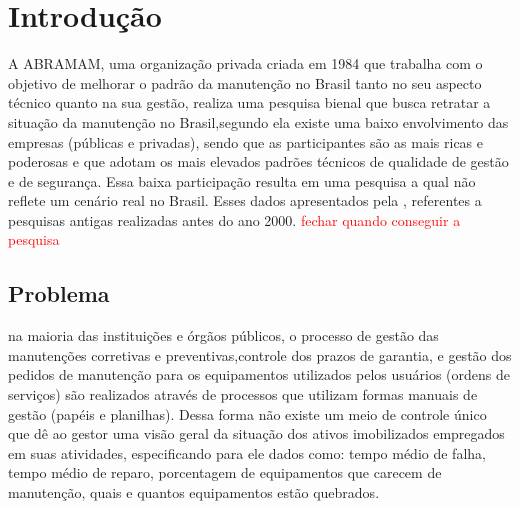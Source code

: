 \chapter{Introdução}
\label{cap-introducao}

A ABRAMAM, uma organização privada criada em 1984 que trabalha com o objetivo de melhorar o padrão da manutenção no Brasil tanto no seu aspecto técnico quanto na sua gestão, realiza uma pesquisa bienal que busca retratar a situação da manutenção no Brasil,segundo ela existe uma baixo envolvimento das empresas (públicas e privadas), sendo que as participantes são as mais ricas e poderosas e que adotam os mais elevados padrões técnicos  de qualidade de gestão e de segurança. Essa baixa participação resulta em uma pesquisa a qual não reflete um cenário real no Brasil. Esses dados apresentados pela \cite{abraman}, referentes a pesquisas antigas realizadas antes do ano 2000. \textcolor{red}{fechar quando conseguir a pesquisa}


%



\section{Problema}


  na maioria das instituições e órgãos públicos, o processo de gestão das manutenções corretivas e preventivas,controle dos prazos de garantia, e gestão dos pedidos de manutenção para os equipamentos utilizados pelos usuários (ordens de serviços) são realizados através de processos que utilizam formas manuais de gestão (papéis e planilhas). Dessa forma não existe um meio de controle único que dê ao gestor uma visão geral da situação dos ativos imobilizados empregados em suas atividades, especificando para ele dados como: tempo médio de falha, tempo médio de reparo, porcentagem de equipamentos que carecem de manutenção, quais e quantos equipamentos estão quebrados.


